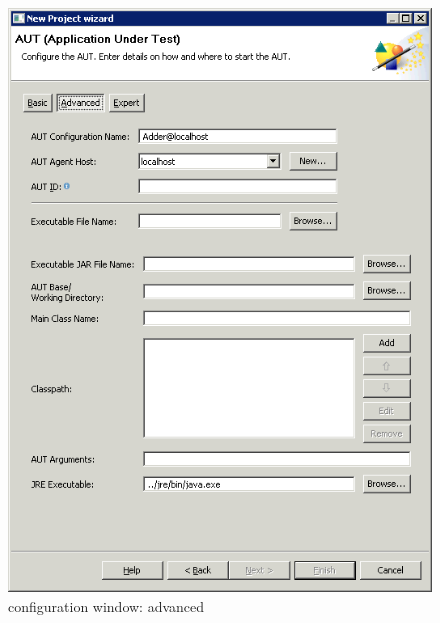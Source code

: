 \begin{figure}[h]
\begin{center}
\includegraphics{Tasks/AUTs/PS/autconfigwindowadvanced}
\caption{\gdaut configuration window: advanced}
\label{autconfigadvanced}
\end{center}
\end{figure}

